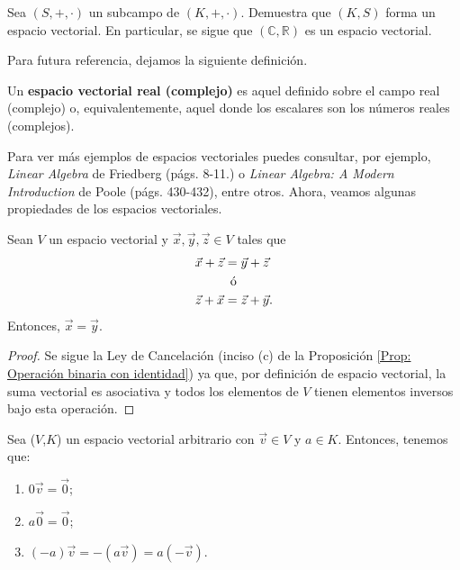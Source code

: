 \documentclass[notasLineal]{subfiles}
\begin{document}
\begin{Ejer}\label{Ejer: Espacio vectorial de campo sobre subcampo}
    Sea $(S,+,\cdot)$ un subcampo de $(K,+,\cdot)$. Demuestra que $(K,S)$ forma un espacio vectorial. En particular, se sigue que $(\mathbb{C},\mathbb{R})$ es un espacio vectorial.
\end{Ejer}

Para futura referencia, dejamos la siguiente definición.

\begin{tcolorbox}
    \begin{Def}\label{Def: Espacio vectorial real y complejo}
        Un \textbf{espacio vectorial real (complejo)} es aquel definido sobre el campo real (complejo) o, equivalentemente, aquel donde los escalares son los números reales (complejos).
    \end{Def}
\end{tcolorbox}{}

Para ver más ejemplos de espacios vectoriales puedes consultar, por ejemplo, \emph{Linear Algebra} de Friedberg (págs. 8-11.) o \emph{Linear Algebra: A Modern Introduction} de Poole (págs. 430-432), entre otros. Ahora, veamos algunas propiedades de los espacios vectoriales.

\begin{Lema}\label{Lema: Ley de Cancelación}
Sean $V$ un espacio vectorial y $\vec{x},\vec{y},\vec{z}\in V$ tales que
\begin{align*}
    \vec{x}+\vec{z}&=\vec{y}+\vec{z} \\
                   &\hspace{1.75mm}\text{ó} \\
    \vec{z}+\vec{x}&=\vec{z}+\vec{y}.
\end{align*}Entonces, $\vec{x}=\vec{y}$.
\end{Lema}

\begin{proof}
    Se sigue la Ley de Cancelación (inciso (c) de la Proposición \ref{Prop: Operación binaria con identidad}) ya que, por definición de espacio vectorial, la suma vectorial es asociativa y todos los elementos de $V$ tienen elementos inversos bajo esta operación.
\end{proof}

\begin{Teo}\label{teo:1.8}
    Sea ($V$,$K$) un espacio vectorial arbitrario con $\vec{v}\in V$ y $a\in K$. Entonces, tenemos que:
    \begin{enumerate}[label=(\alph*)]

        \item $0\vec{v}=\vec{0}$;

        \item $a\vec{0}=\vec{0}$;

        \item $(-a)\vec{v}=-(a\vec{v})=a(-\vec{v})$.
    \end{enumerate}
\end{Teo}
\end{document}
